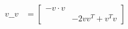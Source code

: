 \documentclass[draft]{scrartcl}
\renewcommand{\blank}{\_\_}
\begin{document}
\begin{multicols*}{2}
\begin{align*}
    v\blank v &=
    \begin{bmatrix}
      -v\cdot v &  \\
       & -2vv^T+ v^Tv
    \end{bmatrix} \\
  \end{align*}


\end{multicols*}
\end{document}
